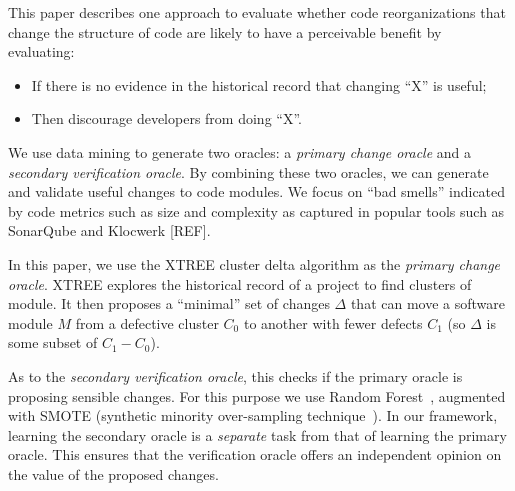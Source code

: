 \documentclass[twocolumn,5p]{elsarticle}
\newcommand{\bi}{\begin{itemize}[leftmargin=0.4cm]}
\newcommand{\ei}{\end{itemize}}
\theoremstyle{break}
\begin{document}
	This paper describes one approach to evaluate whether code reorganizations that change the structure of code are likely to have a perceivable benefit by evaluating:
	\bi
	\item If there is no evidence in the historical record that changing ``X'' is useful;
	\item Then discourage developers from doing ``X''.
	\ei
	We use data mining to generate two oracles: a {\em primary
		change oracle} and a {\em secondary verification oracle}.
	By combining these two oracles,
	we can generate and validate useful
	changes to code modules. We focus on ``bad smells'' indicated by code metrics such as size and complexity as captured in popular tools such as SonarQube and Klocwerk [REF].
	
	In this paper, we use 
	the XTREE cluster delta algorithm as the {\em primary change  oracle}.
	XTREE 
	explores the historical record of a project to find clusters of module.
	It then proposes a ``minimal'' set of changes $\Delta$ that can move a software module $M$ from a defective cluster $C_0$ to another with fewer defects $C_1$ (so $\Delta$
	is some subset of $C_1 - C_0$). %
	
	As to 
	the {\em secondary verification oracle}, this  checks if the primary oracle is proposing
	sensible changes. For this purpose we use Random Forest~\cite{breiman2001random}, augmented with SMOTE (synthetic  minority over-sampling technique~\cite{chawla2002smote}).
	In our framework,  learning
	the secondary oracle is   a {\em separate} task from that of learning the primary
	oracle. This  ensures that the verification oracle offers an independent
	opinion on the value of the proposed changes.
	
\end{document}

